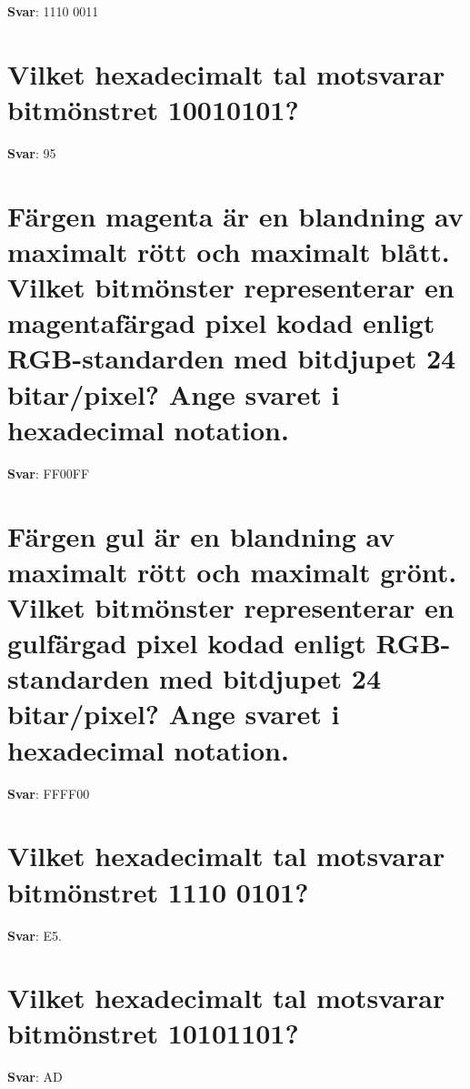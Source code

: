 \documentclass[a4paper,11pt,oneside]{book}
\begin{document}
\begin{sloppypar}
\label{q:423:sa:sv:True}

\textbf{Svar}: 1110 0011



\section{Vilket hexadecimalt tal motsvarar bitm\"onstret 10010101?}

\label{q:424:sa:sv:True}

\textbf{Svar}: 95



\section{F\"argen magenta \"ar en blandning av maximalt r\"ott och maximalt bl\r{a}tt. Vilket bitm\"onster representerar en magentaf\"argad pixel kodad enligt RGB-standarden med bitdjupet 24 bitar/pixel? Ange svaret i hexadecimal notation.}

\label{q:425:sa:sv:True}

\textbf{Svar}: FF00FF



\section{F\"argen gul \"ar en blandning av maximalt r\"ott och maximalt gr\"ont. Vilket bitm\"onster representerar en gulf\"argad pixel kodad enligt RGB-standarden med bitdjupet 24 bitar/pixel? Ange svaret i hexadecimal notation.}

\label{q:426:sa:sv:True}

\textbf{Svar}: FFFF00



\section{Vilket hexadecimalt tal motsvarar bitm\"onstret 1110 0101?}

\label{q:427:sa:sv:True}

\textbf{Svar}: E5.



\section{Vilket hexadecimalt tal motsvarar bitm\"onstret 10101101?}

\label{q:428:sa:sv:True}

\textbf{Svar}: AD




\end{sloppypar}
\end{document}
